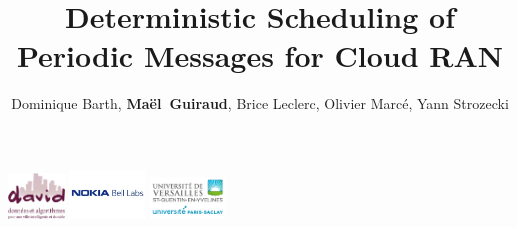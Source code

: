 \documentclass[10 pt]{beamer}
\title{Deterministic Scheduling of Periodic Messages for Cloud RAN}
\author{Dominique Barth, {\bf Maël~Guiraud}, Brice Leclerc, Olivier Marcé, Yann Strozecki }
\institute[Nokia Bell Labs, DAVID-UVSQ] 
{
  DAVID, Universit\'e de Versailles Saint Quentin -
  Nokia Bell Labs France \\
}
\begin{document}
\begin{frame}

  \titlepage
  \centering
  \includegraphics [width=15mm]{logod.png} \hspace{1cm} \includegraphics [width=20mm]{logon.png} \hspace{1cm} \includegraphics [width=20mm]{logo.png} \\
\end{frame}
\end{document}
